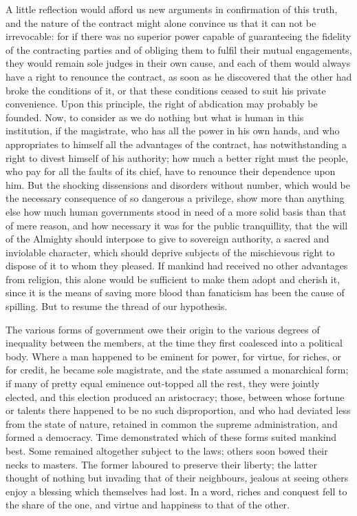 \documentclass[11pt,twocolumn]{ltugboat}
\begin{document}
A little reflection would afford us new arguments in confirmation of
this truth, and the nature of the contract might alone convince us
that it can not be irrevocable: for if there was no superior power
capable of guaranteeing the fidelity of the contracting parties and of
obliging them to fulfil their mutual engagements, they would remain
sole judges in their own cause, and each of them would always have a
right to renounce the contract, as soon as he discovered that the
other had broke the conditions of it, or that these conditions ceased
to suit his private convenience. Upon this principle, the right of
abdication may probably be founded. Now, to consider as we do nothing
but what is human in this institution, if the magistrate, who has all
the power in his own hands, and who appropriates to himself all the
advantages of the contract, has notwithstanding a right to divest
himself of his authority; how much a better right must the people, who
pay for all the faults of its chief, have to renounce their dependence
upon him. But the shocking dissensions and disorders without number,
which would be the necessary consequence of so dangerous a privilege,
show more than anything else how much human governments stood in need
of a more solid basis than that of mere reason, and how necessary it
was for the public tranquillity, that the will of the Almighty should
interpose to give to sovereign authority, a sacred and inviolable
character, which should deprive subjects of the mischievous right to
dispose of it to whom they pleased. If mankind had received no other
advantages from religion, this alone would be sufficient to make them
adopt and cherish it, since it is the means of saving more blood than
fanaticism has been the cause of spilling. But to resume the thread of
our hypothesis.

The various forms of government owe their origin to the various
degrees of inequality between the members, at the time they first
coalesced into a political body. Where a man happened to be eminent
for power, for virtue, for riches, or for credit, he became sole
magistrate, and the state assumed a monarchical form; if many of
pretty equal eminence out-topped all the rest, they were jointly
elected, and this election produced an aristocracy; those, between
whose fortune or talents there happened to be no such disproportion,
and who had deviated less from the state of nature, retained in common
the supreme administration, and formed a democracy. Time demonstrated
which of these forms suited mankind best. Some remained altogether
subject to the laws; others soon bowed their necks to masters. The
former laboured to preserve their liberty; the latter thought of
nothing but invading that of their neighbours, jealous at seeing
others enjoy a blessing which themselves had lost. In a word, riches
and conquest fell to the share of the one, and virtue and happiness to
that of the other.
\end{document}
